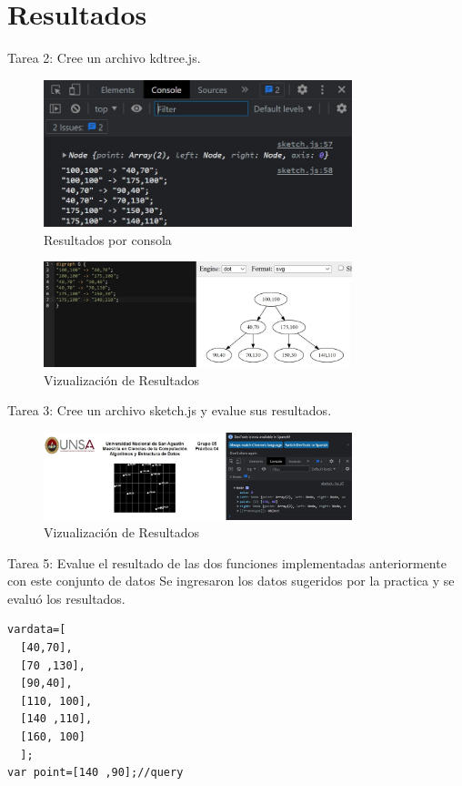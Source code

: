 \documentclass{article}
\begin{document}
\section{Resultados}
Tarea 2: Cree un archivo kdtree.js.

\begin{figure}[H]
\centering
\includegraphics[width=0.8\textwidth]{img/Resultado2.jpg}
\caption{Resultados por consola}
\end{figure}

\begin{figure}[H]
\centering
\includegraphics[width=0.8\textwidth]{img/Resultado2.1.jpg}
\caption{Vizualización de Resultados}
\end{figure}

Tarea 3: Cree un archivo sketch.js y evalue sus resultados.
\begin{figure}[H]
\centering
\includegraphics[width=0.8\textwidth]{img/Resultado3.jpg}
\caption{Vizualización de Resultados}
\end{figure}

Tarea 5: Evalue el resultado de las dos funciones implementadas anteriormente con este conjunto de datos
Se ingresaron los datos sugeridos por la practica y se evaluó los resultados.
\begin{lstlisting}[style=C]
vardata=[
  [40,70],
  [70 ,130],
  [90,40],
  [110, 100],
  [140 ,110],
  [160, 100]
  ];
var point=[140 ,90];//query
\end{lstlisting}
\end{document}
